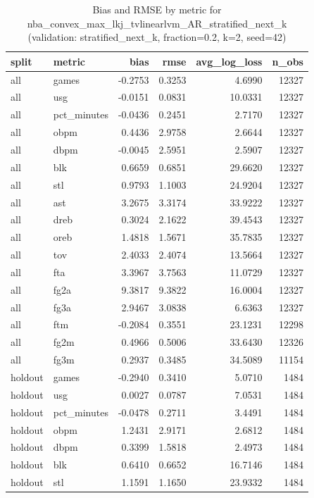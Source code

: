 \begin{table}
\caption{Bias and RMSE by metric for nba_convex_max_lkj_tvlinearlvm_AR_stratified_next_k (validation: stratified_next_k, fraction=0.2, k=2, seed=42)}
\label{tab:nba_convex_max_lkj_tvlinearlvm_AR_stratified_next_k_vs_stratified_next_k_f20_k2_s42_bias_rmse}
\begin{tabular}{llrrrr}
\toprule
split & metric & bias & rmse & avg\_log\_loss & n\_obs \\
\midrule
all & games & -0.2753 & 0.3253 & 4.6990 & 12327 \\
all & usg & -0.0151 & 0.0831 & 10.0331 & 12327 \\
all & pct\_minutes & -0.0436 & 0.2451 & 2.7170 & 12327 \\
all & obpm & 0.4436 & 2.9758 & 2.6644 & 12327 \\
all & dbpm & -0.0045 & 2.5951 & 2.5907 & 12327 \\
all & blk & 0.6659 & 0.6851 & 29.6620 & 12327 \\
all & stl & 0.9793 & 1.1003 & 24.9204 & 12327 \\
all & ast & 3.2675 & 3.3174 & 33.9222 & 12327 \\
all & dreb & 0.3024 & 2.1622 & 39.4543 & 12327 \\
all & oreb & 1.4818 & 1.5671 & 35.7835 & 12327 \\
all & tov & 2.4033 & 2.4074 & 13.5664 & 12327 \\
all & fta & 3.3967 & 3.7563 & 11.0729 & 12327 \\
all & fg2a & 9.3817 & 9.3822 & 16.0004 & 12327 \\
all & fg3a & 2.9467 & 3.0838 & 6.6363 & 12327 \\
all & ftm & -0.2084 & 0.3551 & 23.1231 & 12298 \\
all & fg2m & 0.4966 & 0.5006 & 33.6430 & 12326 \\
all & fg3m & 0.2937 & 0.3485 & 34.5089 & 11154 \\
holdout & games & -0.2940 & 0.3410 & 5.0710 & 1484 \\
holdout & usg & 0.0027 & 0.0787 & 7.0531 & 1484 \\
holdout & pct\_minutes & -0.0478 & 0.2711 & 3.4491 & 1484 \\
holdout & obpm & 1.2431 & 2.9171 & 2.6812 & 1484 \\
holdout & dbpm & 0.3399 & 1.5818 & 2.4973 & 1484 \\
holdout & blk & 0.6410 & 0.6652 & 16.7146 & 1484 \\
holdout & stl & 1.1591 & 1.1650 & 23.9332 & 1484 \\

\end{tabular}
\end{table}
